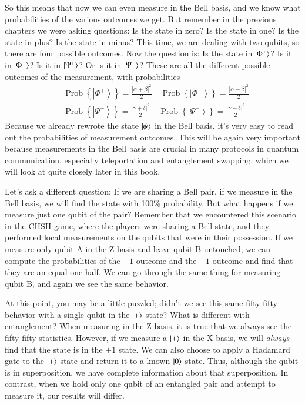 So this means that now we can even measure in the Bell basis, and we know what probabilities of the various outcomes we get. But remember in the previous chapters we were asking questions: Is the state in zero? Is the state in one? Is the state in plus? Is the state in minus?  This time, we are dealing with two qubits, so there are four possible outcomes. Now the question is: Is the state in $\left| \Phi^+ \right\rangle$? Is it in $\left| \Phi^- \right\rangle$? Is it in $\left| \Psi^+ \right\rangle$? Or is it in $\left| \Psi^- \right\rangle$? These are all the different possible outcomes of the measurement, with probabilities
\begin{equation}
\begin{aligned}
&\operatorname{Prob}\left\{\left|\Phi^{+}\right\rangle\right\}=\frac{|\alpha+\beta|^{2}}{2} \quad \operatorname{Prob}\left\{\left|\Phi^{-}\right\rangle\right\}=\frac{|\alpha-\beta|^{2}}{2} \\
&\operatorname{Prob}\left\{\left|\Psi^{+}\right\rangle\right\}=\frac{|\gamma+\delta|^{2}}{2} \quad \operatorname{Prob}\left\{\left|\Psi^{-}\right\rangle\right\}=\frac{|\gamma-\delta|^{2}}{2}
\end{aligned}
\end{equation}
Because we already rewrote the state $\left| \psi \right\rangle$ in the Bell basis, it's very easy to read out the probabilities of measurement outcomes.
This will be again very important because measurements in the Bell basis are crucial in many protocols in quantum communication, especially teleportation and entanglement swapping, which we will look at quite closely later in this book.

Let's ask a different question: If we are sharing a \ket{\Phi^+} Bell pair, if we measure in the Bell basis, we will find the state \ket{\Phi^+} with 100\% probability. But what happens if we measure just one qubit of the pair? Remember that we encountered this scenario in the CHSH game, where the players were sharing a Bell state, and they performed local measurements on the qubits that were in their possession. 
If we measure only qubit A in the Z basis and leave qubit B untouched, we can compute the probabilities of the $+1$ outcome and the $-1$ outcome and find that they are an equal one-half.   We can go through the same thing for measuring qubit B, and again we see the same behavior.

\label{page:plus-is-pure}
At this point, you may be a little puzzled; didn't we see this same fifty-fifty behavior with a single qubit in the $\left| + \right\rangle$ state?  What is different with entanglement?  When measuring in the Z basis, it is true that we always see the fifty-fifty statistics.  However, if we measure a $\left| + \right\rangle$ in the X basis, we will \emph{always} find that the state is in the $+1$ state.  We can also choose to apply a Hadamard gate to the $\left| + \right\rangle$ state and return it to a known $\left| 0 \right\rangle$ state.  Thus, although the qubit is in superposition, we have complete information about that superposition.  In contrast, when we hold only one qubit of an entangled pair and attempt to measure it, our results will differ.

